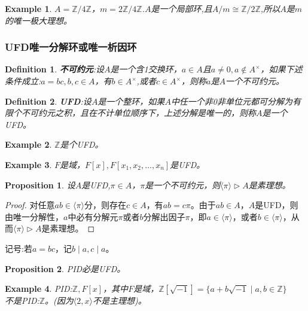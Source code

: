 \documentclass[UTF8]{article}
\newtheorem{defn}{Definition}[section]
\newtheorem{prop}{Proposition}[section]
\newtheorem{exa}{Example}[section]
\begin{document}
\begin{exa}
	$A=\mathbb Z/{4\mathbb Z}$，$m=2\mathbb Z/{4\mathbb Z}$.$A$是一个局部环,且$A/m\cong\mathbb Z/{2\mathbb Z}$,所以$A$是$m$的唯一极大理想。
\end{exa}


\subsubsection{UFD唯一分解环或唯一析因环}
\begin{defn}
	\textbf{不可约元}:设$A$是一个含1交换环，$a\in A$且$a\neq 0,a\notin A^\times$，如果下述条件成立:$a=bc,b,c\in A$，有$b\in A^\times$,或者$c\in A^\times$，则称$a$是$A$一个不可约元。
	
\end{defn}

\begin{defn}
	\textbf{UFD}:设$A$是一个整环，如果$A$中任一个非0非单位元都可分解为有限个不可约元之积，且在不计单位顺序下，上述分解是唯一的，则称$A$是一个UFD。
\end{defn}

\begin{exa}
	$\mathbb Z$是个UFD。
\end{exa}

\begin{exa}
	$F$是域，$F[x],F[x_1,x_2,\dots,x_n]$是UFD。
\end{exa}

\begin{prop}
	设$A$是UFD,$\pi\in A$，$\pi$是一个不可约元，则$\langle\pi\rangle\triangleright A$是素理想。
\end{prop}
\begin{proof}
	对任意$ab\in\langle\pi\rangle$分，则存在$c\in A$，有$ab=c\pi$。由于$ab\in A$，$A$是UFD，则由唯一分解性，$a$中必有分解元$\pi$或者$b$分解出因子$\pi$，即$a\in\langle\pi\rangle$，或者$b\in\langle\pi\rangle$，从而$\langle\pi\rangle\triangleright A$是素理想。
\end{proof}

记号:若$a=bc$，记$b\mid a,c\mid a$。

\begin{prop}
	PID必是UFD。
\end{prop}

\begin{exa}
	PID:$\mathbb Z,F[x]$，其中$F$是域，$\mathbb Z[\sqrt{-1}]=\{a+b\sqrt{-1}\mid a,b\in\mathbb Z\}$\\
	不是PID:$\mathbb Z$。(因为$\langle{2,x}\rangle$不是主理想)。
\end{exa}
\end{document}
